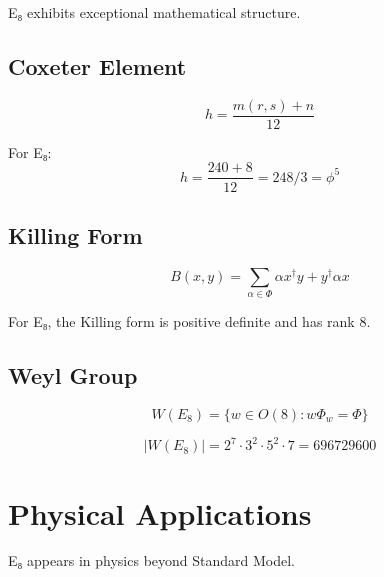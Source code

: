 E₈ exhibits exceptional mathematical structure.

\subsection{Coxeter Element}

\begin{definition}
\label{def:coxeter}
\begin{equation}
h = \frac{m(r,s) + n}{12}
\end{equation}

For E₈:
\begin{equation}
h = \frac{240 + 8}{12} = 248/3 = \phi^5
\end{equation}
\end{definition}

\subsection{Killing Form}

\begin{equation}
B(x,y) = \sum_{\alpha \in \Phi} \alpha x^\dagger y + y^\dagger \alpha x
\end{equation}

\begin{proposition}
\label{prop:killing}
For E₈, the Killing form is positive definite and has rank 8.
\end{proposition}

\subsection{Weyl Group}

\begin{equation}
W(E_8) = \{w \in O(8) : w\Phi_w = \Phi\}
\end{equation}

\begin{theorem}
\label{thm:weyl-order}
\begin{equation}
|W(E_8)| = 2^7 \cdot 3^2 \cdot 5^2 \cdot 7 = 696729600
\end{equation}
\end{theorem}

\section{Physical Applications}

E₈ appears in physics beyond Standard Model.

